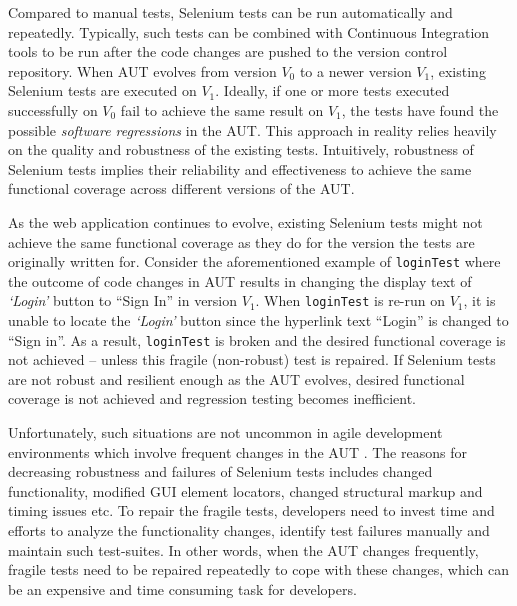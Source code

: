 Compared to manual tests, Selenium tests can be run automatically and repeatedly. Typically, such tests can be combined with Continuous Integration tools to be run after the code changes are pushed to the version control repository. When AUT evolves from version $V_{0}$ to a newer version $V_{1}$, existing Selenium tests are executed on $V_{1}$. Ideally, if one or more tests executed successfully on $V_{0}$ fail to achieve the same result on $V_{1}$, the tests have found the possible \textit{software regressions} in the AUT. This approach in reality relies heavily on the quality and robustness of the existing tests. Intuitively, robustness of Selenium tests implies their reliability and effectiveness to achieve the same functional coverage across different versions of the AUT. 


As the web application continues to evolve, existing Selenium tests might not achieve the same functional coverage as they do for the version the tests are originally written for. Consider the aforementioned example of \texttt{loginTest} where the outcome of code changes in AUT results in changing the display text of \textit{`Login'} button to ``Sign In'' in version $V_{1}$. When \texttt{loginTest} is re-run on $V_{1}$, it is unable to locate the \textit{`Login'} button since the hyperlink text ``Login'' is changed to ``Sign in''. As a result, \texttt{loginTest} is broken and the desired functional coverage is not achieved -- unless this fragile (non-robust) test is repaired. If Selenium tests are not robust and resilient enough as the AUT evolves, desired functional coverage is not achieved and regression testing becomes inefficient.


Unfortunately, such situations are not uncommon in agile development environments which involve frequent changes in the AUT \cite{martin2003agile}. The reasons for decreasing robustness and failures of Selenium tests includes changed functionality, modified GUI element locators, changed structural markup and timing issues etc. To repair the fragile tests, developers need to invest time and efforts to analyze the functionality changes, identify test failures manually and maintain such test-suites. In other words, when the AUT changes frequently, fragile tests need to be repaired repeatedly to cope with these changes, which can be an expensive and time consuming task for developers. 

